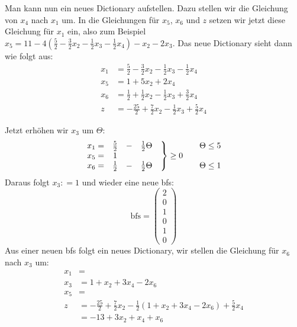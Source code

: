 \begin{Bsp}
  Man kann nun ein neues Dictionary aufstellen. Dazu stellen wir die Gleichung von $x_4$ nach $x_1$ um. In die Gleichungen für $x_5$, $x_6$ und $z$ setzen wir jetzt diese Gleichung für $x_1$ ein, also zum Beispiel $x_5 = 11 - 4 (\frac{5}{2} - \frac{3}{2} x_2 - \frac{1}{2} x_3 - \frac{1}{2} x_4) - x_2 -2 x_3$. Das neue Dictionary sieht dann wie folgt aus:
  \begin{align*}
    x_1 &= \frac{5}{2} - \frac{3}{2} x_2 - \frac{1}{2} x_3 - \frac{1}{2} x_4 \\
    x_5 &= 1 + 5 x_2 + 2x_4\\
    x_6 &= \frac{1}{2} + \frac{1}{2} x_2 - \frac{1}{2} x_3 + \frac{3}{2} x_4 \\
    z &= - \frac{25}{2} + \frac{7}{2} x_2 - \frac{1}{2}  x_3 + \frac{5}{2} x_4
  \end{align*}

  Jetzt erhöhen wir $x_3$ um $\Theta$:
  \[ \left. \begin{matrix} x_1 = & \frac{5}{2} & - & \frac{1}{2} \Theta\\ x_5 = & 1 \\ x_6 = & \frac{1}{2} & - & \frac{1}{2} \Theta\end{matrix}\quad \right\} \ge 0 \qquad \begin{matrix}\Theta \le 5 \\\strut\\ \Theta \le 1 \end{matrix}\]
  Daraus folgt $x_3 : = 1$ und wieder eine neue bfs:
  \[ \text{bfs} = \begin{pmatrix}2 \\ 0 \\ 1 \\ 0 \\ 1 \\ 0\end{pmatrix} \]
  Aus einer neuen bfs folgt ein neues Dictionary, wir stellen die Gleichung für $x_6$ nach $x_3$ um:
  \begin{align*}
    x_1 &= \\
    x_3 &= 1 + x_2 + 3 x_4 - 2 x_6 \\
    x_5 &= \\
    z &= -\frac{25}{2} + \frac{7}{2} x_2 - \frac{1}{2} (1 + x_2 + 3 x_4 - 2x_6) + \frac{5}{2} x_4\\
      &= -13 + 3 x_2 + x_4 + x_6
  \end{align*}


\end{Bsp}
